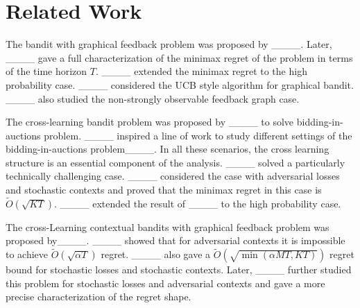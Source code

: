 \section{Related Work}
The bandit with graphical feedback problem was proposed by ____.
%
Later, ____ gave a full characterization of the minimax regret of the problem in terms of the time horizon $T$.  ____ extended the minimax regret to the high probability case.
%
____ considered the UCB style algorithm for graphical bandit.
%
____ also studied the non-strongly observable feedback graph case.

The cross-learning bandit problem was proposed by ____ to solve bidding-in-auctions problem. ____ inspired a line of work to study different settings of the bidding-in-auctions problem____. In all these scenarios, the cross learning structure is an essential component of the analysis. ____ solved a particularly technically challenging case. ____ considered the case with adversarial losses and stochastic contexts and proved that the minimax regret in this case is $\widetilde{O}(\sqrt{KT})$. ____ extended the result of ____ to the high probability case.

The cross-Learning contextual bandits with graphical feedback problem was proposed by____. ____ showed that for adversarial contexts it is impossible to achieve $\widetilde{O}(\sqrt{\alpha T})$ regret. ____ also gave a $\widetilde{O}(\sqrt{\min(\alpha MT,KT)})$ regret bound for stochastic losses and stochastic contexts. Later, ____ further studied this problem for stochastic losses and adversarial contexts and gave a more precise characterization of the regret shape.